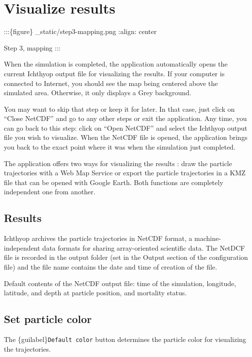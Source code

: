 \documentclass[
  letterpaper,
  DIV=11,
  numbers=noendperiod]{scrreprt}
\begin{document}

\chapter{Visualize results}\label{visualize-results}

:::\{figure\} \_static/step3-mapping.png :align: center

Step 3, mapping :::

When the simulation is completed, the application automatically opens
the current Ichthyop output file for visualizing the results. If your
computer is connected to Internet, you should see the map being centered
above the simulated area. Otherwise, it only displays a Grey background.

You may want to skip that step or keep it for later. In that case, just
click on ``Close NetCDF'' and go to any other steps or exit the
application. Any time, you can go back to this step: click on ``Open
NetCDF'' and select the Ichthyop output file you wish to visualize. When
the NetCDF file is opened, the application brings you back to the exact
point where it was when the simulation just completed.

The application offers two ways for visualizing the results : draw the
particle trajectories with a Web Map Service or export the particle
trajectories in a KMZ file that can be opened with Google Earth. Both
functions are completely independent one from another.

\section{Results}\label{results}

Ichthyop archives the particle trajectories in NetCDF format, a
machine-independent data formats for sharing array-oriented scientific
data. The NetDCF file is recorded in the output folder (set in the
Output section of the configuration file) and the file name contains the
date and time of creation of the file.

Default contents of the NetCDF output file: time of the simulation,
longitude, latitude, and depth at particle position, and mortality
status.

\section{Set particle color}\label{set-particle-color}

The \{guilabel\}\texttt{Default\ color} button determines the particle
color for visualizing the trajectories.
\end{document}
